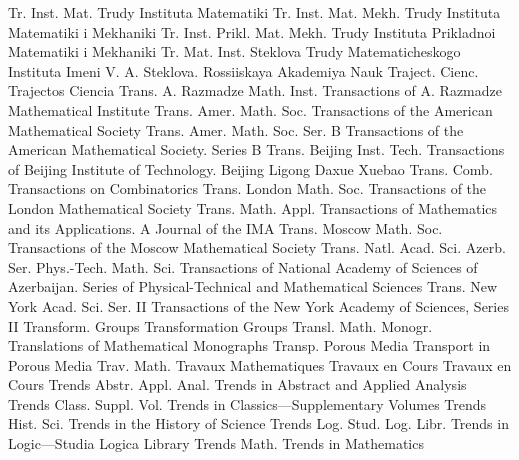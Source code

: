 {Tr. Inst. Mat.}
{Trudy Instituta Matematiki}
{Tr. Inst. Mat. Mekh.}
{Trudy Instituta Matematiki i Mekhaniki}
{Tr. Inst. Prikl. Mat. Mekh.}
{Trudy Instituta Prikladnoi Matematiki i Mekhaniki}
{Tr. Mat. Inst. Steklova}
{Trudy Matematicheskogo Instituta Imeni V. A. Steklova. Rossiiskaya Akademiya Nauk}
{Traject. Cienc.}
{Trajectos Ciencia}
{Trans. A. Razmadze Math. Inst.}
{Transactions of A. Razmadze Mathematical Institute}
{Trans. Amer. Math. Soc.}
{Transactions of the American Mathematical Society}
{Trans. Amer. Math. Soc. Ser. B}
{Transactions of the American Mathematical Society. Series B}
{Trans. Beijing Inst. Tech.}
{Transactions of Beijing Institute of Technology. Beijing Ligong Daxue Xuebao}
{Trans. Comb.}
{Transactions on Combinatorics}
{Trans. London Math. Soc.}
{Transactions of the London Mathematical Society}
{Trans. Math. Appl.}
{Transactions of Mathematics and its Applications. A Journal of the IMA}
{Trans. Moscow Math. Soc.}
{Transactions of the Moscow Mathematical Society}
{Trans. Natl. Acad. Sci. Azerb. Ser. Phys.-Tech. Math. Sci.}
{Transactions of National Academy of Sciences of Azerbaijan. Series of Physical-Technical and Mathematical Sciences}
{Trans. New York Acad. Sci. Ser. II}
{Transactions of the New York Academy of Sciences, Series II}
{Transform. Groups}
{Transformation Groups}
{Transl. Math. Monogr.}
{Translations of Mathematical Monographs}
{Transp. Porous Media}
{Transport in Porous Media}
{Trav. Math.}
{Travaux Mathematiques}
{Travaux en Cours}
{Travaux en Cours}
{Trends Abstr. Appl. Anal.}
{Trends in Abstract and Applied Analysis}
{Trends Class. Suppl. Vol.}
{Trends in Classics---Supplementary Volumes}
{Trends Hist. Sci.}
{Trends in the History of Science}
{Trends Log. Stud. Log. Libr.}
{Trends in Logic---Studia Logica Library}
{Trends Math.}
{Trends in Mathematics}
